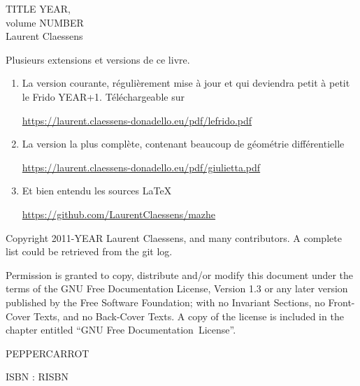 \documentclass[a4paper,twoside,11pt]{book}
\begin{document}
\pagestyle{empty}

\phantom{Foo}
\newpage

\phantom{Foo}
\newpage

\begin{center}
    TITLE YEAR, \\
    volume NUMBER \\
    Laurent Claessens
\end{center}

\newpage

Plusieurs extensions et versions de ce livre.
\begin{enumerate}
    \item
        La version courante, régulièrement mise à jour et qui deviendra petit à petit le Frido YEAR+1. Téléchargeable sur
        \begin{center}
            \url{https://laurent.claessens-donadello.eu/pdf/lefrido.pdf}
        \end{center}
    \item
        La version la plus complète, contenant beaucoup de géométrie différentielle
        \begin{center}
            \url{https://laurent.claessens-donadello.eu/pdf/giulietta.pdf}
        \end{center}
    \item
        Et bien entendu les sources \LaTeX\
        \begin{center}
            \url{https://github.com/LaurentClaessens/mazhe}
        \end{center}
\end{enumerate}

\newpage

\phantom{un foobar bleuté}

\vfill

\begin{center}
Copyright 2011-YEAR  Laurent Claessens, and many contributors. A complete list could be retrieved from the git log.

Permission is granted to copy, distribute and/or modify this document under the terms of the GNU Free Documentation License, Version 1.3 or any later version published by the Free Software Foundation; with no Invariant Sections, no Front-Cover Texts, and no Back-Cover Texts. A copy of the license is included in the chapter entitled ``GNU Free Documentation~License''.
\end{center}

\begin{center}
    PEPPERCARROT
\end{center}

    \begin{center}
ISBN : RISBN
    \end{center}
\end{document}
